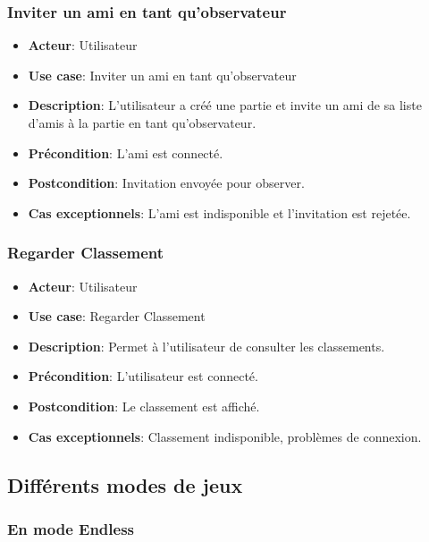 \documentclass{article}
\begin{document}
\subsubsection*{Inviter un ami en tant qu'observateur}
\begin{itemize}
    \item \textbf{Acteur}: Utilisateur
    \item \textbf{Use case}: Inviter un ami en tant qu'observateur
    \item \textbf{Description}: L'utilisateur a créé une partie et invite un ami de sa liste d'amis à la partie en tant qu'observateur.
    \item \textbf{Précondition}: L'ami est connecté.
    \item \textbf{Postcondition}: Invitation envoyée pour observer.
    \item \textbf{Cas exceptionnels}: L'ami est indisponible et l'invitation est rejetée.
\end{itemize}

\subsubsection*{Regarder Classement}
\begin{itemize}
    \item \textbf{Acteur}: Utilisateur
    \item \textbf{Use case}: Regarder Classement
    \item \textbf{Description}: Permet à l'utilisateur de consulter les classements.
    \item \textbf{Précondition}: L'utilisateur est connecté.
    \item \textbf{Postcondition}: Le classement est affiché.
    \item \textbf{Cas exceptionnels}: Classement indisponible, problèmes de connexion.
\end{itemize}

\newpage

\subsection{Différents modes de jeux}

\subsubsection{En mode Endless}
\end{document}
